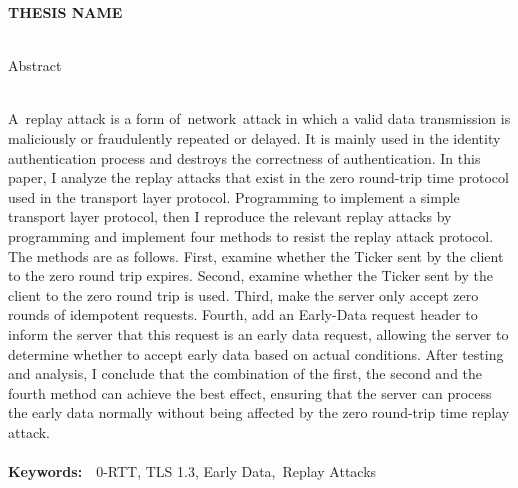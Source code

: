 \begin{center}
  {\bfseries THESIS NAME}
  \\ \hspace*{\fill} \\
   Abstract
\end{center}

  \ \\
  A replay attack is a form of network attack in which a valid data transmission is maliciously or fraudulently repeated or delayed. It is mainly used in the identity authentication process and destroys the correctness of authentication. In this paper, I analyze the replay attacks that exist in the zero round-trip time protocol used in the transport layer protocol. Programming to implement a simple transport layer protocol, then I reproduce the relevant replay attacks by programming and implement four methods to resist the replay attack protocol. The methods are as follows. First, examine whether the Ticker sent by the client to the zero round trip expires. Second, examine whether the Ticker sent by the client to the zero round trip is used. Third, make the server only accept zero rounds of idempotent requests. Fourth, add an Early-Data request header to inform the server that this request is an early data request, allowing the server to determine whether to accept early data based on actual conditions. After testing and analysis, I conclude that the combination of the first, the second and the fourth method can achieve the best effect, ensuring that the server can process the early data normally without being affected by the zero round-trip time replay attack.
  \ \\
  \ \\
  \textbf{Keywords:}\ \ 0-RTT, TLS 1.3, Early Data,\ Replay Attacks
\newpage